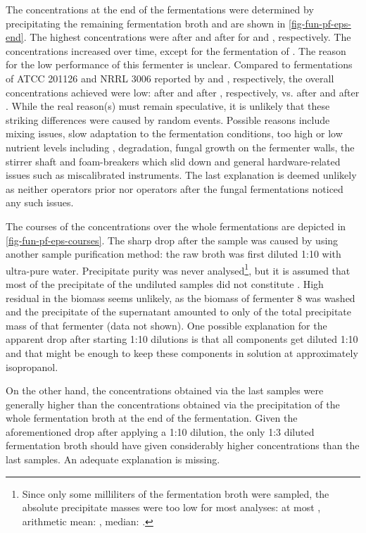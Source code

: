 The \eps{} concentrations at the end of the fermentations were determined by precipitating the remaining fermentation broth and are shown in \vref{fig-fun-pf-eps-end}. The highest concentrations were  after  and  after  for \rolf{} and \comm{}, respectively. The concentrations increased over time, except for the  fermentation of \comm{}. The reason for the low performance of this fermenter is unclear. Compared to fermentations of  ATCC 201126 and  NRRL 3006 reported by \textcite{Farina1998} and \textcite{Taurhesia1994a}, respectively, the overall \eps{} concentrations achieved were low:  after  and  after , respectively, vs.  after  and  after . While the real reason(s) must remain speculative, it is unlikely that these striking differences were caused by random events. Possible reasons include mixing issues, slow adaptation to the fermentation conditions, too high or low nutrient levels including , degradation, fungal growth on the fermenter walls, the stirrer shaft and foam-breakers which slid down and general hardware-related issues such as miscalibrated instruments. The last explanation is deemed unlikely as neither operators prior nor operators after the fungal fermentations noticed any such issues.

The courses of the \eps{} concentrations over the whole fermentations are depicted in \vref{fig-fun-pf-eps-courses}. The sharp drop after the  sample was caused by using another sample purification method: the raw broth was first diluted 1:10 with ultra-pure water. Precipitate purity was never analysed\footnote{Since only some milliliters of the fermentation broth were sampled, the absolute precipitate masses were too low for most analyses: at most , arithmetic mean: , median: .}, but it is assumed that most of the precipitate of the undiluted samples did not constitute \eps{}. High residual \eps{} in the biomass seems unlikely, as the biomass of fermenter 8 was washed and the precipitate of the supernatant amounted to only  of the total precipitate mass of that fermenter (data not shown). One possible explanation for the apparent drop after starting 1:10 dilutions is that all components get diluted 1:10 and that might be enough to keep these components in solution at approximately  isopropanol.

On the other hand, the concentrations obtained via the last samples were generally higher than the concentrations obtained via the precipitation of the whole fermentation broth at the end of the fermentation. Given the aforementioned drop after applying a 1:10 dilution, the only 1:3 diluted fermentation broth should have given considerably higher concentrations than the last samples. An adequate explanation is missing. 


